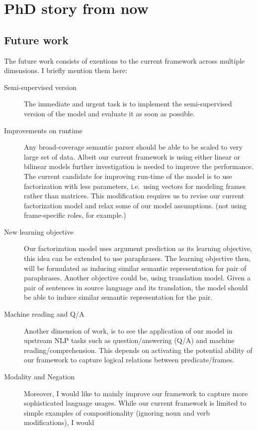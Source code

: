 \chapter{PhD story from now}



\section{Future work}
\label{sec:fwork}

The future work consists of exentions to the current framework across multiple
dimensions. I briefly mention them here:

\begin{description}
  \item[Semi-supervised version] The immediate and urgent task is to implement the semi-supervised
version of the model and evaluate it as soon as possible.
  \item[Improvements on runtime] Any broad-coverage semantic parser
should be able to be scaled to very large set of data. Albeit our current
framework is using either linear or bilinear models further investigation is
needed to improve the performance. The current candidate for improving run-time
of the model is to use factorization with less parameters, i.e.\ using vectors
for modeling frames rather than matrices. This modification requires us to
revise our current factorization model and relax some of our model assumptions.
(not using frame-specific roles, for example.)
  \item[New learning objective] Our factorization model uses argument
  prediction as its learning objective, this idea can be extended to use
  paraphrases. The learning objective then, will be formulated as inducing
  similar semantic representation for pair of paraphrases. Another objective
  could be, using translation model. Given a pair of sentences in source
  language and its translation, the model should be able to induce similar
  semantic representation for the pair.
  \item[Machine reading and Q/A] Another dimension of work, is to see the
  application of our model in upstream NLP tasks such as question/answering (Q/A) and machine
reading/comprehension. This depends on activating the potential ability of our
framework to capture logical relations between predicate/frames. 
  \item[Modality and Negation] Moreover, I would like to mainly
improve our framework to capture more sophisticated language usages. While our current framework is limited to simple examples of compositionality (ignoring noun and verb modifications), I would

\end{description}
